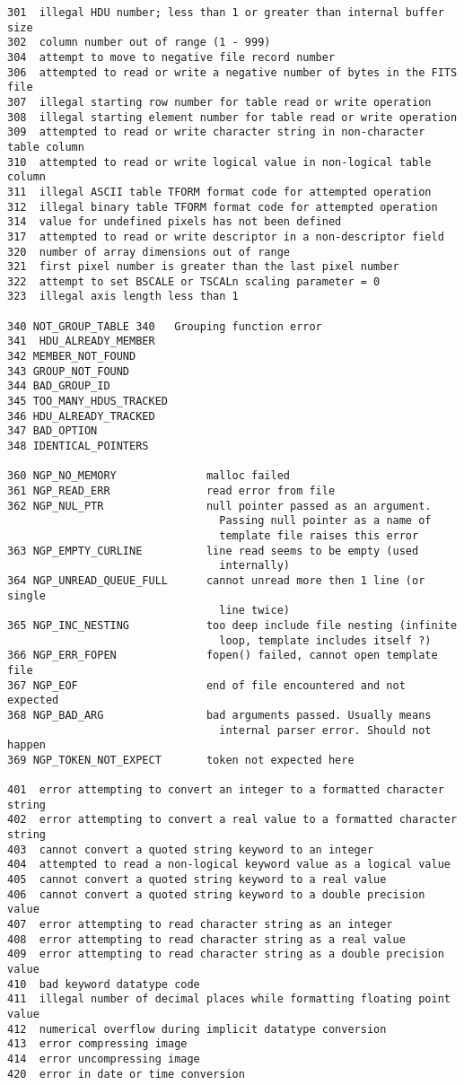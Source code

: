 \documentclass[11pt]{book}
\begin{document}
\begin{verbatim}
301  illegal HDU number; less than 1 or greater than internal buffer size
302  column number out of range (1 - 999)
304  attempt to move to negative file record number
306  attempted to read or write a negative number of bytes in the FITS file
307  illegal starting row number for table read or write operation
308  illegal starting element number for table read or write operation
309  attempted to read or write character string in non-character table column
310  attempted to read or write logical value in non-logical table column
311  illegal ASCII table TFORM format code for attempted operation
312  illegal binary table TFORM format code for attempted operation
314  value for undefined pixels has not been defined
317  attempted to read or write descriptor in a non-descriptor field
320  number of array dimensions out of range
321  first pixel number is greater than the last pixel number
322  attempt to set BSCALE or TSCALn scaling parameter = 0
323  illegal axis length less than 1

340 NOT_GROUP_TABLE 340   Grouping function error
341  HDU_ALREADY_MEMBER
342 MEMBER_NOT_FOUND
343 GROUP_NOT_FOUND
344 BAD_GROUP_ID
345 TOO_MANY_HDUS_TRACKED
346 HDU_ALREADY_TRACKED
347 BAD_OPTION
348 IDENTICAL_POINTERS

360 NGP_NO_MEMORY              malloc failed
361 NGP_READ_ERR               read error from file
362 NGP_NUL_PTR                null pointer passed as an argument.
                                 Passing null pointer as a name of
                                 template file raises this error
363 NGP_EMPTY_CURLINE          line read seems to be empty (used
                                 internally)
364 NGP_UNREAD_QUEUE_FULL      cannot unread more then 1 line (or single
                                 line twice)
365 NGP_INC_NESTING            too deep include file nesting (infinite
                                 loop, template includes itself ?)
366 NGP_ERR_FOPEN              fopen() failed, cannot open template file
367 NGP_EOF                    end of file encountered and not expected
368 NGP_BAD_ARG                bad arguments passed. Usually means
                                 internal parser error. Should not happen
369 NGP_TOKEN_NOT_EXPECT       token not expected here

401  error attempting to convert an integer to a formatted character string
402  error attempting to convert a real value to a formatted character string
403  cannot convert a quoted string keyword to an integer
404  attempted to read a non-logical keyword value as a logical value
405  cannot convert a quoted string keyword to a real value
406  cannot convert a quoted string keyword to a double precision value
407  error attempting to read character string as an integer
408  error attempting to read character string as a real value
409  error attempting to read character string as a double precision value
410  bad keyword datatype code
411  illegal number of decimal places while formatting floating point value
412  numerical overflow during implicit datatype conversion
413  error compressing image
414  error uncompressing image
420  error in date or time conversion


\end{verbatim}
\end{document}
